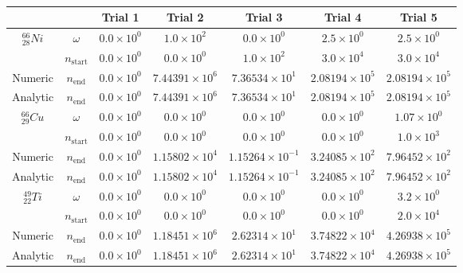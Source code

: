 \begin{table}[h]
\begin{center}
\begin{longtable}{c c c c c c c}
\hline\hline
 &  & Trial 1 & Trial 2 & Trial 3 & Trial 4 & Trial 5 \\
\hline\hline
${}^{66}_{28}Ni$ & $\omega$ & 
${0.0} \times 10^{0}$ & ${1.0} \times 10^{2}$ & ${0.0} \times 10^{0}$ &
${2.5} \times 10^{0}$ & ${2.5} \times 10^{0}$ \\
 & $n_{\text{start}}$ & 
${0.0} \times 10^{0}$ & ${0.0} \times 10^{0}$ & ${1.0} \times 10^{2}$ & 
${3.0} \times 10^{4}$ & ${3.0} \times 10^{4}$ \\
Numeric & $n_{\text{end}}$ & 
${0.0} \times 10^{0}$ & ${7.44391} \times 10^{6}$ & ${7.36534} \times 10^{1}$ & 
${2.08194} \times 10^{5}$ & ${2.08194} \times 10^{5}$ \\
Analytic & $n_{\text{end}}$ & 
${0.0} \times 10^{0}$ & ${7.44391} \times 10^{6}$ & ${7.36534} \times 10^{1}$ & 
${2.08194} \times 10^{5}$ & ${2.08194} \times 10^{5}$ \\
\hline
${}^{66}_{29}Cu$ & $\omega$ & 
${0.0} \times 10^{0}$ & ${0.0} \times 10^{0}$ & ${0.0} \times 10^{0}$ &
${0.0} \times 10^{0}$ & ${1.07} \times 10^{0}$ \\
 & $n_{\text{start}}$ & 
${0.0} \times 10^{0}$ & ${0.0} \times 10^{0}$ & ${0.0} \times 10^{0}$ &
${0.0} \times 10^{0}$ & ${1.0} \times 10^{3}$ \\
Numeric & $n_{\text{end}}$ & 
${0.0} \times 10^{0}$ & ${1.15802} \times 10^{4}$ & ${1.15264} \times 10^{-1}$ & 
${3.24085} \times 10^{2}$ & ${7.96452} \times 10^{2}$ \\
Analytic & $n_{\text{end}}$ & 
${0.0} \times 10^{0}$ & ${1.15802} \times 10^{4}$ & ${1.15264} \times 10^{-1}$ & 
${3.24085} \times 10^{2}$ & ${7.96452} \times 10^{2}$ \\
\hline
${}^{49}_{22}Ti$ & $\omega$ & 
${0.0} \times 10^{0}$ & ${0.0} \times 10^{0}$ & ${0.0} \times 10^{0}$ &
${0.0} \times 10^{0}$ & ${3.2} \times 10^{0}$ \\
 & $n_{\text{start}}$ & 
${0.0} \times 10^{0}$ & ${0.0} \times 10^{0}$ & ${0.0} \times 10^{0}$ &
${0.0} \times 10^{0}$ & ${2.0} \times 10^{4}$ \\
Numeric & $n_{\text{end}}$ & 
${0.0} \times 10^{0}$ & ${1.18451} \times 10^{6}$ & ${2.62314} \times 10^{1}$ & 
${3.74822} \times 10^{4}$ & ${4.26938} \times 10^{5}$ \\
Analytic & $n_{\text{end}}$ & 
${0.0} \times 10^{0}$ & ${1.18451} \times 10^{6}$ & ${2.62314} \times 10^{1}$ & 
${3.74822} \times 10^{4}$ & ${4.26938} \times 10^{5}$ \\
\hline\hline
\end{longtable}
\end{center}
\caption{}
\label{table:ni66trialdata}
\end{table}





